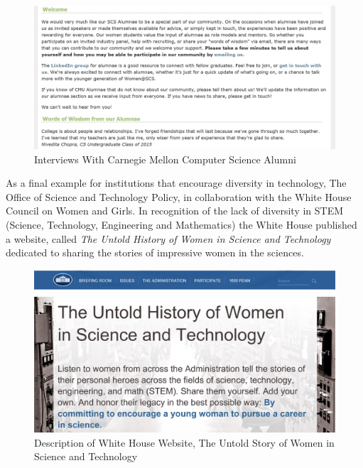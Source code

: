 \documentclass[12pt]{article}
\begin{document}
		
		
		\begin{figure}[H]
			\begin{center}
				\includegraphics[width=\textwidth,keepaspectratio]{CarnegieAlumni}
				\caption{Interviews With Carnegie Mellon Computer Science Alumni}
			\end{center}
		\end{figure}
		  
	
	As a final example for institutions that encourage diversity in technology, The Office of Science and Technology Policy, in collaboration with the White House Council on Women and Girls. In recognition of the lack of diversity in STEM (Science, Technology, Engineering and Mathematics) the White House published a website, called \textit{The Untold History of Women in Science and Technology} dedicated to sharing the stories of impressive women in the sciences. \\
	
			\begin{figure}[H]
				\begin{center}
					\includegraphics[width=\textwidth,keepaspectratio]{WhiteHouse}
					\caption{Description of White House Website, The Untold Story of Women in Science and Technology}
				\end{center}
			\end{figure}
			
\end{document}
